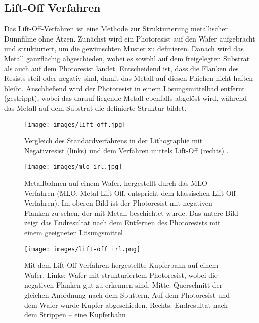 \documentclass{article} %
\begin{document}
\vspace{1em}

\subsection{Lift-Off Verfahren}

Das Lift-Off-Verfahren ist eine Methode zur Strukturierung metallischer Dünnfilme ohne Ätzen. Zunächst wird ein Photoresist auf den Wafer aufgebracht und strukturiert, um die gewünschten Muster zu definieren. Danach wird das Metall ganzflächig abgeschieden, wobei es sowohl auf dem freigelegten Substrat als auch auf dem Photoresist landet. Entscheidend ist, dass die Flanken des Resists steil oder negativ sind, damit das Metall auf diesen Flächen nicht haften bleibt. Anschließend wird der Photoresist in einem Lösungsmittelbad entfernt (gestrippt), wobei das darauf liegende Metall ebenfalls abgelöst wird, während das Metall auf dem Substrat die definierte Struktur bildet.

\begin{figure}[htb!]
    \centering
    \texttt{[image: images/lift-off.jpg]} %
    \captionsetup{labelfont=bf, width=\textwidth} %
    \caption{Vergleich des Standardverfahrens in der Lithographie mit Negativresist (links) und dem Verfahren mittels Lift-Off (rechts) \cite{ZeloofWebsite}.}
    \label{fig:lift-off}
\end{figure}

\begin{figure}[htb!]
    \centering
    \texttt{[image: images/mlo-irl.jpg]} %
    \captionsetup{labelfont=bf, width=.75\textwidth} %
    \caption{Metallbahnen auf einem Wafer, hergestellt durch das MLO-Verfahren (MLO, Metal-Lift-Off, entspricht dem klassischen Lift-Off-Verfahren). Im oberen Bild ist der Photoresist mit negativen Flanken zu sehen, der mit Metall beschichtet wurde. Das untere Bild zeigt das Endresultat nach dem Entfernen des Photoresists mit einem geeigneten Lösungsmittel \cite{ClassOneLiftOff}.}
    \label{fig:mlo-irl}
\end{figure}

\begin{figure}[htb!]
    \centering
    \texttt{[image: images/lift-off irl.png]} %
    \captionsetup{labelfont=bf, width=\textwidth} %
    \caption{Mit dem Lift-Off-Verfahren hergestellte Kupferbahn auf einem Wafer. Links: Wafer mit strukturiertem Photoresist, wobei die negativen Flanken gut zu erkennen sind. Mitte: Querschnitt der gleichen Anordnung nach dem Sputtern. Auf dem Photoresist und dem Wafer wurde Kupfer abgeschieden. Rechts: Endresultat nach dem Strippen -- eine Kupferbahn \cite{jsr_lift_resists}.}
\label{fig:lift-off irl}
\end{figure}
\end{document}
